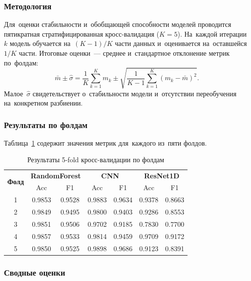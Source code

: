 \subsubsection{Методология}

Для~оценки стабильности и~обобщающей способности моделей
проводится пятикратная стратифицированная кросс-валидация
($K = 5$).
На~каждой итерации $k$ модель обучается на~$(K-1)/K$ части
данных и~оценивается на~оставшейся $1/K$ части.
Итоговые оценки~--- среднее и~стандартное отклонение
метрик по~фолдам:
\begin{equation}
    \bar{m} \pm \hat{\sigma} = \frac{1}{K}\sum_{k=1}^{K} m_k
    \pm \sqrt{\frac{1}{K-1}\sum_{k=1}^{K}(m_k - \bar{m})^2}.
\end{equation}
Малое~$\hat{\sigma}$ свидетельствует о~стабильности модели
и~отсутствии переобучения на~конкретном разбиении.

\subsubsection{Результаты по фолдам}

Таблица~\ref{tab:cv_folds} содержит значения метрик
для~каждого из~пяти фолдов.

\begin{table}[h]
\centering
\caption{Результаты 5-fold кросс-валидации по фолдам}
\label{tab:cv_folds}
\begin{tabular}{ccccccc}
\hline
\multirow{2}{*}{\textbf{Фолд}} &
\multicolumn{2}{c}{\textbf{RandomForest}} &
\multicolumn{2}{c}{\textbf{CNN}} &
\multicolumn{2}{c}{\textbf{ResNet1D}} \\
& Acc & F1 & Acc & F1 & Acc & F1 \\
\hline
1 & 0.9853 & 0.9528 & 0.9883 & 0.9634 & 0.9378 & 0.8663 \\
2 & 0.9849 & 0.9495 & 0.9800 & 0.9403 & 0.9286 & 0.8553 \\
3 & 0.9851 & 0.9506 & 0.9702 & 0.9185 & 0.7830 & 0.7700 \\
4 & 0.9857 & 0.9533 & 0.9814 & 0.9459 & 0.9709 & 0.9172 \\
5 & 0.9850 & 0.9525 & 0.9898 & 0.9686 & 0.9123 & 0.8391 \\
\hline
\end{tabular}
\end{table}

\subsubsection{Сводные оценки}

